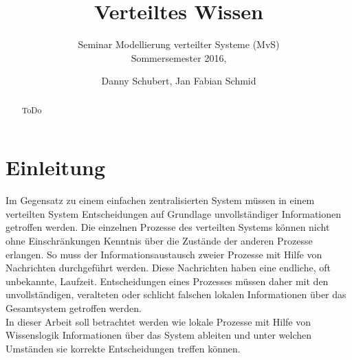 \documentclass{llncs}
\begin{document}
\title{Verteiltes Wissen}
\subtitle{\small{ Seminar Modellierung verteilter Systeme (MvS)\\ Sommersemester 2016,}}
\author{Danny Schubert, Jan Fabian Schmid\\}
\maketitle

\begin{abstract}
ToDo
\end{abstract}

\section{Einleitung}
Im Gegensatz zu einem einfachen zentralisierten System müssen in einem verteilten System Entscheidungen auf Grundlage unvollständiger Informationen getroffen werden.
Die einzelnen Prozesse des verteilten Systems können nicht ohne Einschränkungen Kenntnis über die Zustände der anderen Prozesse erlangen.
So muss der Informationsaustausch zweier Prozesse mit Hilfe von Nachrichten durchgeführt werden. Diese Nachrichten haben eine endliche, oft unbekannte, Laufzeit.
Entscheidungen eines Prozesses müssen daher mit den unvollständigen, veralteten oder schlicht falschen lokalen Informationen über das Gesamtsystem getroffen werden.\\
In dieser Arbeit soll betrachtet werden wie lokale Prozesse mit Hilfe von Wissenslogik Informationen über das System ableiten und unter welchen Umständen sie korrekte Entscheidungen treffen können.
\end{document}
